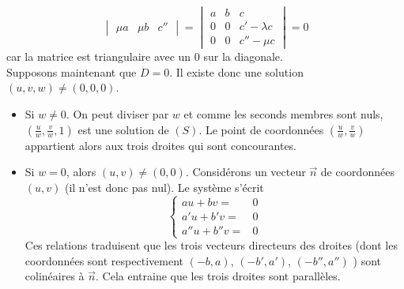 \begin{demo}
\begin{displaymath}
\begin{vmatrix}
\mu a & \mu b & c'' 
\end{vmatrix}
=\begin{vmatrix}
 a & b & c \\
0 & 0 & c'-\lambda c \\
0 & 0 & c''-\mu c 
\end{vmatrix}=0
\end{displaymath}
car la matrice est triangulaire avec un $0$ sur la diagonale.\\
Supposons maintenant que $D=0$. Il existe donc une solution $(u,v,w)\neq (0,0,0)$.
\begin{itemize}
 \item Si $w\neq 0$. On peut diviser par $w$ et comme les seconds membres sont nuls, $(\frac{u}{w},\frac{v}{w},1)$ est une solution de $(S)$. Le point de coordonnées $(\frac{u}{w},\frac{v}{w})$ appartient alors aux trois droites qui sont concourantes.
\item Si $w= 0$, alors $(u,v)\neq (0,0)$. Considérons un vecteur $\overrightarrow n$ de coordonnées $(u,v)$ (il n'est donc pas nul). Le système s'écrit
\begin{displaymath}
 \left\lbrace 
\begin{aligned}
 au+bv =&0\\
a'u+b'v =&0\\
a''u+b''v =&0
\end{aligned}
\right. 
\end{displaymath}
Ces relations traduisent que les trois vecteurs directeurs des droites (dont les coordonnées sont respectivement $(-b,a)$, $(-b',a')$, $(-b'',a'')$ ) sont colinéaires à $\overrightarrow n$. Cela entraine que les trois droites sont parallèles.
\end{itemize}
\end{demo}

